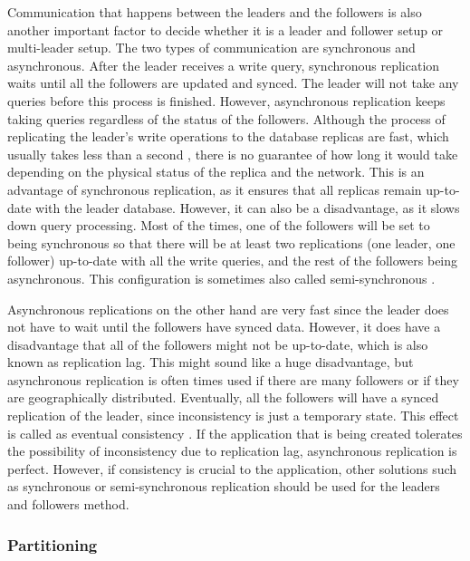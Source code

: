 Communication that happens between the leaders and the followers is also another important factor to decide whether it is a
leader and follower setup or multi-leader setup. The two types of communication are synchronous and asynchronous.
After the leader receives a write query, synchronous replication waits until all the followers are updated and synced.
The leader will not take any queries before this process is finished.
However, asynchronous replication keeps taking queries regardless of the status of the followers.
Although the process of replicating the leader’s write operations to the database replicas are fast, which usually takes less than a second \cite{Kleppmann_2017},
there is no guarantee of how long it would take depending on the physical status of the replica and the network.
This is an advantage of synchronous replication, as it ensures that all replicas remain up-to-date with the leader database.
However, it can also be a disadvantage, as it slows down query processing.
Most of the times,
one of the followers will be set to being synchronous so that there will be at least two replications (one leader, one follower)
up-to-date with all the write queries, and the rest of the followers being asynchronous. This configuration is sometimes also called semi-synchronous \cite{Kleppmann_2017}.

Asynchronous replications on the other hand are very fast since the leader does not have to wait until the followers have synced data.
However, it does have a disadvantage that all of the followers might not be up-to-date, which is also known as replication lag.
This might sound like a huge disadvantage, but asynchronous replication is often times used if there are many followers or if they are geographically distributed.
Eventually, all the followers will have a synced replication of the leader, since inconsistency is just a temporary state.
This effect is called as eventual consistency \cite{Kleppmann_2017}.
If the application that is being created tolerates the possibility of inconsistency due to replication lag,
asynchronous replication is perfect. However, if consistency is crucial to the application, other solutions such as synchronous or semi-synchronous
replication should be used for the leaders and followers method. 


\subsubsection{Partitioning}

